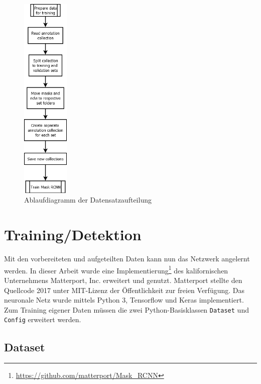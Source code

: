 \begin{figure}[ht]
  \centering
  \includegraphics[height=0.5\textheight,width=0.2\textwidth]{pics/create-sets.png}
  \caption{Ablaufdiagramm der Datensatzaufteilung}
  \label{fig:create-ndvi}
\end{figure}

\section{Training/Detektion}\label{sec:training}

Mit den vorbereiteten und aufgeteilten Daten kann nun das Netzwerk angelernt werden. In dieser Arbeit wurde eine Implementierung\footnote{\url{https://github.com/matterport/Mask_RCNN}} des kalifornischen Unternehmens Matterport, Inc. erweitert und genutzt. Matterport stellte den Quellcode 2017 unter MIT-Lizenz der Öffentlichkeit zur freien Verfügung. Das neuronale Netz wurde mittels Python 3, Tensorflow und Keras implementiert. Zum Training eigener Daten müssen die zwei Python-Basisklassen \texttt{Dataset} und \texttt{Config} erweitert werden. 

\subsection{Dataset}\label{sub:sec:dataset}

